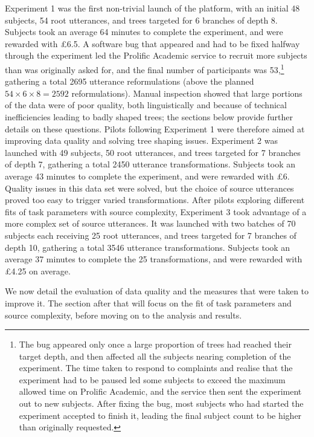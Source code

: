 Experiment 1 was the first non-trivial launch of the platform, with an
initial 48 subjects, 54 root utterances, and trees targeted for 6
branches of depth 8. Subjects took an average 64 minutes to complete the
experiment, and were rewarded with £6.5. A software bug that appeared
and had to be fixed halfway through the experiment led the Prolific
Academic service to recruit more subjects than was originally asked for,
and the final number of participants was 53,\footnote{The bug appeared
  only once a large proportion of trees had reached their target depth,
  and then affected all the subjects nearing completion of the
  experiment. The time taken to respond to complaints and realise that
  the experiment had to be paused led some subjects to exceed the
  maximum allowed time on Prolific Academic, and the service then sent
  the experiment out to new subjects. After fixing the bug, most
  subjects who had started the experiment accepted to finish it, leading
  the final subject count to be higher than originally requested.}
gathering a total 2695 utterance reformulations (above the planned
\(54 \times 6 \times 8 = 2592\) reformulations). Manual inspection
showed that large portions of the data were of poor quality, both
linguistically and because of technical inefficiencies leading to badly
shaped trees; the sections below provide further details on these
questions. Pilots following Experiment 1 were therefore aimed at
improving data quality and solving tree shaping issues. Experiment 2 was
launched with 49 subjects, 50 root utterances, and trees targeted for 7
branches of depth 7, gathering a total 2450 utterance transformations.
Subjects took an average 43 minutes to complete the experiment, and were
rewarded with £6. Quality issues in this data set were solved, but the
choice of source utterances proved too easy to trigger varied
transformations. After pilots exploring different fits of task
parameters with source complexity, Experiment 3 took advantage of a more
complex set of source utterances. It was launched with two batches of 70
subjects each receiving 25 root utterances, and trees targeted for 7
branches of depth 10, gathering a total 3546 utterance transformations.
Subjects took an average 37 minutes to complete the 25 transformations,
and were rewarded with £4.25 on average.

We now detail the evaluation of data quality and the measures that were
taken to improve it. The section after that will focus on the fit of
task parameters and source complexity, before moving on to the analysis
and results.

